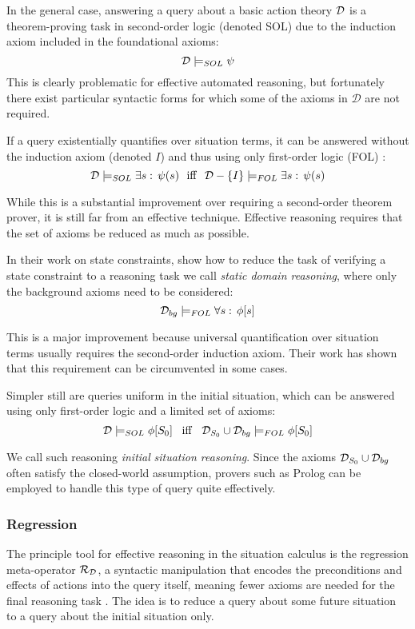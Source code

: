 In the general case, answering a query about a basic action theory
$\mathcal{D}$ is a theorem-proving task in second-order logic (denoted SOL)
due to the induction axiom included in the foundational axioms:\[
\mathcal{D}\models_{SOL}\psi\]
 This is clearly problematic for effective automated reasoning, but
fortunately there exist particular syntactic forms for which some
of the axioms in $\mathcal{D}$ are not required.

If a query existentially quantifies over situation terms, it can be
answered without the induction axiom (denoted $I$) and thus using
only first-order logic (FOL) \citep{pirri99contributions_sitcalc}:\[
\mathcal{D}\models_{SOL}\exists s:\,\psi(s)\,\,\,\,\mathrm{iff}\,\,\,\,\mathcal{D}-\{I\}\models_{FOL}\exists s:\,\psi(s)\]


While this is a substantial improvement over requiring a second-order
theorem prover, it is still far from an effective technique. Effective
reasoning requires that the set of axioms be reduced as much as possible.

In their work on state constraints, \citet{Lin94-StateConstraints}
show how to reduce the task of verifying a state constraint to a reasoning
task we call \emph{static domain reasoning}, where only the background
axioms need to be considered:\[
\mathcal{D}_{bg}\models_{FOL}\forall s:\,\phi[s]\]


This is a major improvement because universal quantification over
situation terms usually requires the second-order induction axiom.
Their work has shown that this requirement can be circumvented in
some cases.

Simpler still are queries uniform in the initial situation, which
can be answered using only first-order logic and a limited set of
axioms:\[
\mathcal{D}\models_{SOL}\phi[S_{0}]\,\,\,\,\,\mathit{\mathrm{iff}}\,\,\,\,\,\mathcal{D}_{S_{0}}\cup\mathcal{D}_{bg}\models_{FOL}\phi[S_{0}]\]


We call such reasoning \emph{initial} \emph{situation reasoning}.
Since the axioms $\mathcal{D}_{S_{0}}\cup\mathcal{D}_{bg}$ often satisfy the closed-world
assumption, provers such as Prolog can be employed to handle this
type of query quite effectively.


\subsubsection{Regression}

The principle tool for effective reasoning in the situation calculus
is the regression meta-operator $\mathcal{R}_{\mathcal{D}}$, a syntactic manipulation
that encodes the preconditions and effects of actions into the query
itself, meaning fewer axioms are needed for the final reasoning task
\citep{pirri99contributions_sitcalc}. The idea is to reduce a query
about some future situation to a query about the initial situation
only.

